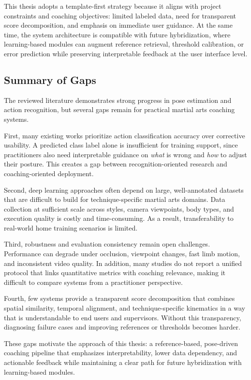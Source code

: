 \documentclass[12pt]{article}
\begin{document}
{This thesis adopts a template-first strategy because it aligns with project constraints and coaching objectives: limited labeled data, need for transparent score decomposition, and emphasis on immediate user guidance. At the same time, the system architecture is compatible with future hybridization, where learning-based modules can augment reference retrieval, threshold calibration, or error prediction while preserving interpretable feedback at the user interface level.

\subsection{Summary of Gaps}
The reviewed literature demonstrates strong progress in pose estimation and action recognition, but several gaps remain for practical martial arts coaching systems.

First, many existing works prioritize action classification accuracy over corrective usability. A predicted class label alone is insufficient for training support, since practitioners also need interpretable guidance on \emph{what} is wrong and \emph{how} to adjust their posture. This creates a gap between recognition-oriented research and coaching-oriented deployment.

Second, deep learning approaches often depend on large, well-annotated datasets that are difficult to build for technique-specific martial arts domains. Data collection at sufficient scale across styles, camera viewpoints, body types, and execution quality is costly and time-consuming. As a result, transferability to real-world home training scenarios is limited.

Third, robustness and evaluation consistency remain open challenges. Performance can degrade under occlusion, viewpoint changes, fast limb motion, and inconsistent video quality. In addition, many studies do not report a unified protocol that links quantitative metrics with coaching relevance, making it difficult to compare systems from a practitioner perspective.

Fourth, few systems provide a transparent score decomposition that combines spatial similarity, temporal alignment, and technique-specific kinematics in a way that is understandable to end users and supervisors. Without this transparency, diagnosing failure cases and improving references or thresholds becomes harder.

These gaps motivate the approach of this thesis: a reference-based, pose-driven coaching pipeline that emphasizes interpretability, lower data dependency, and actionable feedback while maintaining a clear path for future hybridization with learning-based modules.

}
\end{document}
